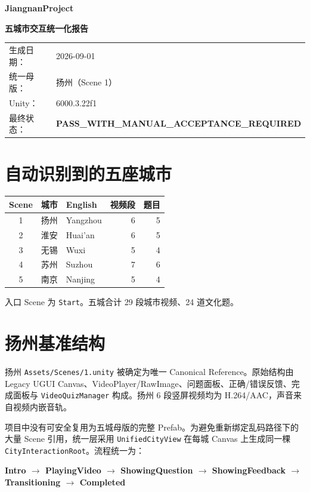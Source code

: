 \documentclass[UTF8,a4paper,11pt]{ctexart}
\newcommand{\status}[1]{\textcolor{jade}{\textbf{#1}}}
\newcommand{\code}[1]{\texttt{#1}}
\begin{document}
{\Huge\bfseries\color{ink} JiangnanProject\par}
\vspace{0.35em}
{\LARGE\bfseries\color{jade} 五城市交互统一化报告\par}
\vspace{0.8em}
\begin{tabular}{@{}ll@{}}
生成日期： & 2026-09-01 \\
统一母版： & 扬州（Scene 1） \\
Unity： & 6000.3.22f1 \\
最终状态： & \status{PASS\_WITH\_MANUAL\_ACCEPTANCE\_REQUIRED}
\end{tabular}
\vspace{1em}

\section{自动识别到的五座城市}
\begin{center}
\begin{tabular}{cllrr}
\toprule
Scene & 城市 & English & 视频段 & 题目\\
\midrule
1 & 扬州 & Yangzhou & 6 & 5\\
2 & 淮安 & Huai'an & 6 & 5\\
3 & 无锡 & Wuxi & 5 & 4\\
4 & 苏州 & Suzhou & 7 & 6\\
5 & 南京 & Nanjing & 5 & 4\\
\bottomrule
\end{tabular}
\end{center}
入口 Scene 为 \code{Start}。五城合计 29 段城市视频、24 道文化题。

\section{扬州基准结构}
扬州 \code{Assets/Scenes/1.unity} 被确定为唯一 Canonical Reference。原始结构由 Legacy UGUI Canvas、VideoPlayer/RawImage、问题面板、正确/错误反馈、完成面板与 \code{VideoQuizManager} 构成。扬州 6 段竖屏视频均为 H.264/AAC，声音来自视频内嵌音轨。

项目中没有可安全复用为五城母版的完整 Prefab。为避免重新绑定乱码路径下的大量 Scene 引用，统一层采用 \code{UnifiedCityView} 在每城 Canvas 上生成同一棵 \code{CityInteractionRoot}。流程统一为：
\begin{center}
\textbf{Intro $\rightarrow$ PlayingVideo $\rightarrow$ ShowingQuestion $\rightarrow$ ShowingFeedback $\rightarrow$ Transitioning $\rightarrow$ Completed}
\end{center}
\end{document}
